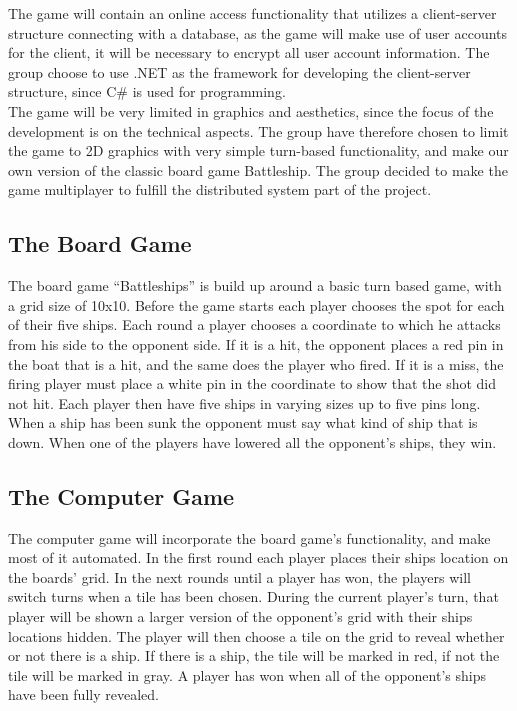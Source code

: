 The game will contain an online access functionality that utilizes
 a client-server structure connecting with a database, as the game will
  make use of user accounts for the client, it will be necessary to encrypt
   all user account information. The group choose to use .NET as the
    framework for developing the client-server structure, since C# is used
     for programming. \\
The game will be very limited in graphics and aesthetics, since the
 focus of the development is on the technical aspects. The group have
  therefore chosen to limit the game to 2D graphics with very simple
   turn-based functionality, and make our own version of the classic
    board game Battleship. The group decided to make the game multiplayer
     to fulfill the distributed system part of the project.

\subsection{The Board Game}

The board game “Battleships” is build up around a basic turn based game,
with a grid size of 10x10. Before the game starts each player chooses the
 spot for each of their five ships. Each round a player chooses a coordinate
  to which he attacks from his side to the opponent side. If it is a hit, the
   opponent places a red pin in the boat that is a hit, and the same does the
    player who fired. If it is a miss, the firing player must place a white
     pin in the coordinate to show that the shot did not hit. Each player
      then have five ships in varying sizes up to five pins long. When a
       ship has been sunk the opponent must say what kind of ship that is
        down. When one of the players have lowered all the opponent's
         ships, they win.

\subsection{The Computer Game}

The computer game will incorporate the board game’s functionality,
 and make most of it automated. In the first round each player places
  their ships location on the boards’ grid. In the next rounds until a
   player has won, the players will switch turns when a tile has been
    chosen. During the current player’s turn, that player will be shown
     a larger version of the opponent’s grid with their ships locations
      hidden. The player will then choose a tile on the grid to reveal
       whether or not there is a ship. If there is a ship, the tile will
        be marked in red, if not the tile will be marked in gray. A player
         has won when all of the opponent's ships have been fully revealed.

